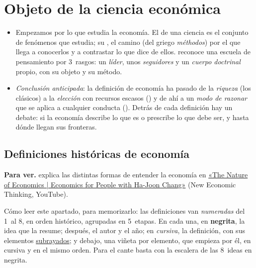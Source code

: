 \documentclass[11pt]{article}
\begin{document}
\section{Objeto de la ciencia económica}\label{sec:objeto}

\begin{itemize}
\item Empezamos por lo que estudia la economía. El  de una ciencia es el conjunto de fenómenos que estudia; su , el camino (del griego \emph{méthodos}) por el que llega a conocerlos y a contrastar lo que dice de ellos.  reconoce una escuela de pensamiento por 3~rasgos: un \emph{líder}, unos \emph{seguidores} y un \emph{cuerpo doctrinal} propio, con su objeto y su método\nocite{Schumpeter1954History}.
\item \emph{Conclusión anticipada}: la definición de economía ha pasado de la \emph{riqueza} (los clásicos) a la \emph{elección} con recursos escasos () y de ahí a un \emph{modo de razonar} que se aplica a cualquier conducta (). Detrás de cada definición hay un debate: si la economía describe lo que es o prescribe lo que debe ser, y hasta dónde llegan sus fronteras.
\end{itemize}

\subsection{Definiciones históricas de economía}\label{sec:definiciones}

\begin{anotaciones}
\textbf{Para ver.}  explica las distintas formas de entender la economía en \href{https://www.youtube.com/watch?v=D-6rQmHpGfE}{«The Nature of Economics | Economics for People with Ha-Joon Chang»} (New Economic Thinking, YouTube).
\end{anotaciones}

\begin{notaopositor}
Cómo leer este apartado, para memorizarlo: las definiciones van \emph{numeradas} del 1~al 8, en orden histórico, agrupadas en 5~etapas. En cada una, en \textbf{negrita}, la idea que la resume; después, el autor y el año; en \emph{cursiva}, la definición, con sus elementos \uline{subrayados}; y debajo, una viñeta por elemento, que empieza por él, en cursiva y en el mismo orden. Para el cante basta con la escalera de las 8~ideas en negrita.
\end{notaopositor}
\end{document}
